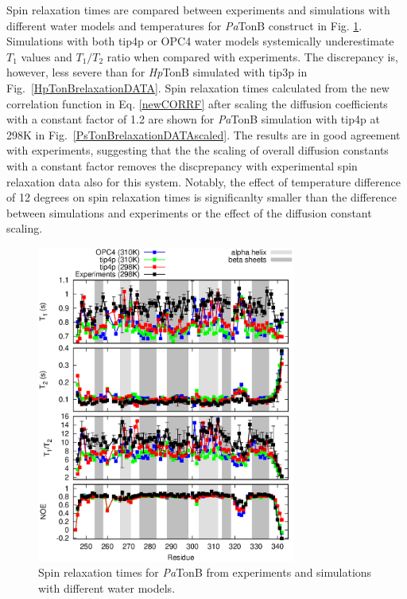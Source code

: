 \documentclass[pre,aps,floatfix,authordate1-4,twocolumn]{revtex4-1}
\begin{document}
Spin relaxation times are compared between experiments and simulations
with different water models and temperatures for {\it Pa}TonB construct
in Fig. \ref{PsTonBrelaxationDATA}.
Simulations with both tip4p
or OPC4 water models systemically underestimate $T_1$ values
and $T_1/T_2$ ratio when compared with experiments. The discrepancy is,
however, less severe than for {\it Hp}TonB simulated with tip3p in Fig.~\ref{HpTonBrelaxationDATA}. 
Spin relaxation times calculated from the new correlation function in Eq. \ref{newCORRF}
after scaling the diffusion coefficients with a constant factor of 1.2
are shown for {\it Pa}TonB simulation with tip4p at 298K in Fig.~\ref{PsTonBrelaxationDATAscaled}.
The results are in good agreement with experiments, suggesting that
the the scaling of overall diffusion constants with a constant factor 
removes the discprepancy with experimental spin relaxation data
also for this system.
Notably, the effect of temperature difference of 12 degrees
on spin relaxation times is significanlty smaller than the difference
between simulations and experiments or the effect of the diffusion constant scaling.
\begin{figure}[!h]
  \includegraphics[width=8.5cm]{../Figs/PsTonBrelaxationDATA.eps}%
  \caption{Spin relaxation times for {\it Pa}TonB from experiments \cite{??}
    and simulations with different water models. 
    \label{PsTonBrelaxationDATA}}%
\end{figure}
\end{document}
